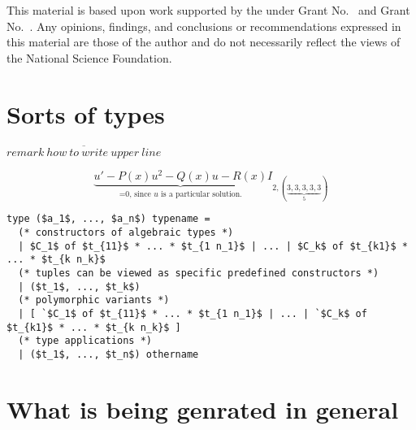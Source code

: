 \documentclass[acmsmall,review,anonymous]{acmart}\settopmatter{printfolios=true,printccs=false,printacmref=false}
\begin{document}
\begin{acks}                            %
  This material is based upon work supported by the
   under Grant
  No.~ and Grant
  No.~.  Any opinions, findings, and
  conclusions or recommendations expressed in this material are those
  of the author and do not necessarily reflect the views of the
  National Science Foundation.
\end{acks}


%

\section{Sorts of types}
$\overline{remark~how~to~write~upper~line}$

\[
\underbrace{u'-P(x)u^2-Q(x)u-R(x)}_{\text{=0, since~$u$ is a particular solution.}}
I_{2,(\underbrace{\scriptstyle3,3,3,3,3}_5)}
\]

\begin{lstlisting}
type ($a_1$, ..., $a_n$) typename =
  (* constructors of algebraic types *)
  | $C_1$ of $t_{11}$ * ... * $t_{1 n_1}$ | ... | $C_k$ of $t_{k1}$ * ... * $t_{k n_k}$
  (* tuples can be viewed as specific predefined constructors *)
  | ($t_1$, ..., $t_k$)
  (* polymorphic variants *)
  | [ `$C_1$ of $t_{11}$ * ... * $t_{1 n_1}$ | ... | `$C_k$ of $t_{k1}$ * ... * $t_{k n_k}$ ]
  (* type applications *)
  | ($t_1$, ..., $t_n$) othername

\end{lstlisting}

\section{What is being genrated in general}
\end{document}
